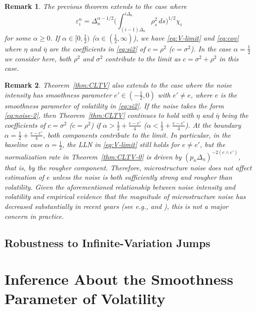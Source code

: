 \documentclass[ecta,nameyear,draft]{econsocart}
\newtheorem{rem}{Remark}
\newcommand{\1}{\mathbf 1}
\numberwithin{equation}{section}
\newcommand{\al}{{\alpha}}
\newcommand{\si}{{\sigma}}
\newcommand{\ov}{\overline}
\newcommand{\Den}{\Delta_n}
\begin{document}
\begin{rem}\label{rem:noise-1}
	The previous theorem extends to the case where
	\begin{equation}
		\label{eq:noise-2}
		\varepsilon_i^n = \Den^{\al-1/2}\Big( \int_{(i-1)\Delta_n}^{i\Delta_n} \rho_{s}^2 \, ds\Big)^{1/2}  \chi_i
	\end{equation}
for some $\al\geq0$. If $\al\in[0,\frac12)$ ($\al\in(\frac12,\infty)$), we have \eqref{eq:V-limit} and \eqref{eq:cov} where $\eta$ and $\ov \eta$ are the coefficients in \eqref{eq:si2} of $c=\rho^2$ ($c=\si^2$). In the case $\al=\frac12$ we consider here, both $\rho^2$ and $\si^2$ contribute to the limit as $c=\si^2+\rho^2$ in this case.
\end{rem}

\begin{rem}\label{rem:noise-2}
	Theorem~\ref{thm:CLTV} also extends to the case where the noise intensity has smoothness parameter $e'\in(-\frac12,0)$ with $e'\neq e$, where $e$ is the smoothness parameter of volatility in \eqref{eq:si2}. If the noise takes the form \eqref{eq:noise-2}, then Theorem~\ref{thm:CLTV} continues to hold with $\eta$ and $\ov\eta$ being the coefficients of $c=\si^2$ ($c=\rho^2$) if $\al>\frac12+\frac{e-e'}{4}$ ($\al<\frac12+\frac{e-e'}{4}$). At the boundary $\al=\frac12+\frac{e-e'}{4}$, both components contribute to the limit. In particular, in the baseline case $\al=\frac12$, the LLN in \eqref{eq:V-limit} still holds for $e\neq e'$, but the normalization rate in Theorem~\ref{thm:CLTV-0} is driven by $(p_n\Delta_n)^{-2(e\wedge e')}$, that is, by the rougher component. Therefore, microstructure noise does not affect estimation of $e$ unless the noise is both sufficiently strong and rougher than volatility. Given the aforementioned relationship between noise intensity and volatility and empirical evidence that the magnitude of microstructure noise has decreased substantially in recent years (see e.g., \cite{AX19} and \cite{LY26}), this is not a major concern in practice.
\end{rem}


\subsection{Robustness to Infinite-Variation Jumps}


\section{Inference About the Smoothness Parameter of Volatility}
\label{sec:estimation}
\end{document}
